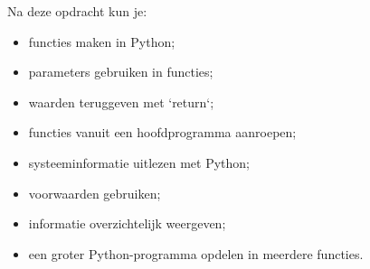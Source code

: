 Na deze opdracht kun je:
\begin{itemize}
\item functies maken in Python;
\item parameters gebruiken in functies;
\item waarden teruggeven met `return`;
\item functies vanuit een hoofdprogramma aanroepen;
\item systeeminformatie uitlezen met Python;
\item voorwaarden gebruiken;
\item informatie overzichtelijk weergeven;
\item een groter Python-programma opdelen in meerdere functies.
\end{itemize}

